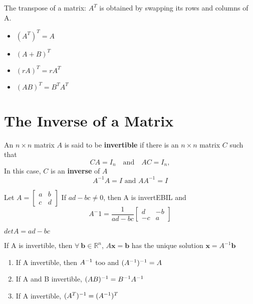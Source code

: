 \documentclass{report}
\begin{document}
The transpose of a matrix: \( A^T \) is obtained by swapping its rows and columns of A.
\begin{theorem}\end{theorem}

\begin{tcolorbox}[colback=blue!5!white, colframe=blue!75!black]
\begin{itemize}
    \item $(A^T)^T = A$ 
    \item $(A + B)^T$ 
    \item $(rA)^T = r A^T$ 
    \item $(AB)^T = B^T A^T$ 
\end{itemize}
\end{tcolorbox}

\section{The Inverse of a Matrix}

An \( n \times n \) matrix \( A \) is said to be \textbf{invertible} if there is an \( n \times n \) matrix \( C \) such that
\[
C A = I_n \quad \text{and} \quad A C = I_n,
\]
In this case, $C$ is an \textbf{inverse} of $A$
\[
A^{-1} A = I \text{ and } A A^{-1} = I
\]

\begin{theorem}
    Let $A = \begin{bmatrix}
        a & b \\ c & d
    \end{bmatrix}$ 
    If $ad - bc \ne 0$, then A is invertEBIL and 
    \[
    A^-1 = \frac{1}{ad -bc}\begin{bmatrix}
        d & -b \\ -c & a
    \end{bmatrix}
    \]
\end{theorem}

$det A = ad - bc$

\begin{theorem}
    If A is invertible, then $\forall \ \mathbf{b} \in \mathbb{R}^n$, 
    $A\mathbf{x} = \mathbf{b}$  
    has the unique solution $\mathbf{x} = A^{-1}\mathbf{b}$
\end{theorem}
\vspace{1cm}
\begin{theorem}
\begin{enumerate}
    \item If A invertible, then $A^{-1}$ too and $(A^{-1})^{-1} = A$
    \item If A and B invertible, $(AB)^{-1} = B^{-1}A^{-1}$
    \item If A invertible, $(A^T)^{-1} = (A^{-1})^T$
\end{enumerate}
\end{theorem}
\end{document}
